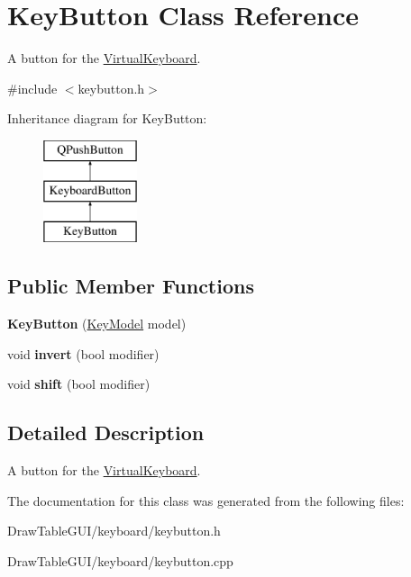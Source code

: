 \hypertarget{classKeyButton}{}\section{Key\+Button Class Reference}
\label{classKeyButton}


A button for the \hyperlink{classVirtualKeyboard}{Virtual\+Keyboard}.  




{\ttfamily \#include $<$keybutton.\+h$>$}

Inheritance diagram for Key\+Button\+:\begin{figure}[H]
\begin{center}
\leavevmode
\includegraphics[height=3.000000cm]{classKeyButton}
\end{center}
\end{figure}
\subsection*{Public Member Functions}
\begin{DoxyCompactItemize}
\item 
\hypertarget{classKeyButton_a409a7086e4c4ce8d0f1a5f08c74dfdd4}{}{\bfseries Key\+Button} (\hyperlink{structKeyModel}{Key\+Model} model)\label{classKeyButton_a409a7086e4c4ce8d0f1a5f08c74dfdd4}

\item 
\hypertarget{classKeyButton_ac01489a6b7c4b4c0e964ec783a775741}{}void {\bfseries invert} (bool modifier)\label{classKeyButton_ac01489a6b7c4b4c0e964ec783a775741}

\item 
\hypertarget{classKeyButton_a25a8cdfb236c1a0549969fb4411c420d}{}void {\bfseries shift} (bool modifier)\label{classKeyButton_a25a8cdfb236c1a0549969fb4411c420d}

\end{DoxyCompactItemize}


\subsection{Detailed Description}
A button for the \hyperlink{classVirtualKeyboard}{Virtual\+Keyboard}. 

The documentation for this class was generated from the following files\+:\begin{DoxyCompactItemize}
\item 
Draw\+Table\+G\+U\+I/keyboard/keybutton.\+h\item 
Draw\+Table\+G\+U\+I/keyboard/keybutton.\+cpp\end{DoxyCompactItemize}
